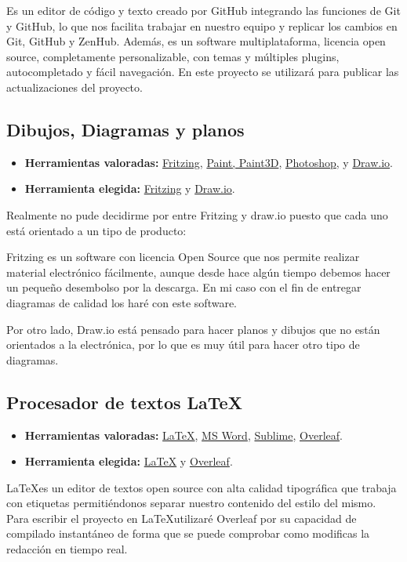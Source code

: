 Es un editor de código y texto creado por GitHub integrando las funciones de Git y GitHub, lo que nos facilita trabajar en nuestro equipo y replicar los cambios en Git, GitHub y ZenHub. Además, es un software multiplataforma, licencia open source, completamente personalizable, con temas y múltiples plugins, autocompletado y fácil navegación.
En este proyecto se utilizará para publicar las actualizaciones del proyecto.



\subsection{Dibujos, Diagramas y planos}
\begin{itemize}
    \item \textbf{Herramientas valoradas:} \href{https://fritzing.org/}{Fritzing}, \href{https://support.microsoft.com/es-es/windows/obtener-microsoft-paint-a6b9578c-ed1c-5b09-0699-4ed8115f9aa9}{Paint, Paint3D}, \href{https://www.adobe.com/es/products/photoshop.html}{Photoshop}, y \href{www.draw.io}{Draw.io}.
    \item \textbf{Herramienta elegida:} \href{https://fritzing.org/}{Fritzing} y \href{www.draw.io}{Draw.io}.
\end{itemize}
Realmente no pude decidirme por entre Fritzing y draw.io puesto que cada uno está orientado a un tipo de producto:

Fritzing es un software con licencia Open Source\cite{misc:OpenSource} que nos permite realizar material electrónico fácilmente, aunque desde hace algún tiempo debemos hacer un pequeño desembolso por la descarga. En mi caso con el fin de entregar diagramas de calidad los haré con este software.

Por otro lado, Draw.io está pensado para hacer planos y dibujos que no están orientados a la electrónica, por lo que es muy útil para hacer otro tipo de diagramas.

\subsection{Procesador de textos \LaTeX}
\begin{itemize}
    \item \textbf{Herramientas valoradas:} \href{https://www.latex-project.org/}{\LaTeX}, \href{https://www.microsoft.com/es-es/microsoft-365/word}{MS Word}, \href{https://www.sublimetext.com/}{Sublime}, \href{https://www.overleaf.com/}{Overleaf}.
    \item \textbf{Herramienta elegida:} \href{https://www.latex-project.org/}{\LaTeX} y \href{https://www.overleaf.com/}{Overleaf}.
\end{itemize}
\LaTeX es un editor de textos open source\cite{misc:OpenSource} con alta calidad tipográfica que trabaja con etiquetas permitiéndonos separar nuestro contenido del estilo del mismo. Para escribir el proyecto en \LaTeX utilizaré Overleaf por su capacidad de compilado instantáneo de forma que se puede comprobar como modificas la redacción en tiempo real.


